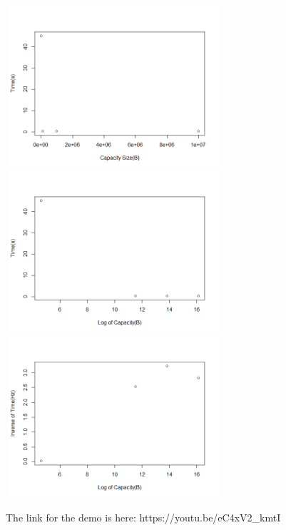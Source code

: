 \documentclass[12pt]{article}
\begin{document}
\begin{center}
\includegraphics[width=8cm, height=6cm]{Time_Plot_Normal}
\includegraphics[width=8cm, height=6cm]{Time_Plot_xlog}
\includegraphics[width=8cm, height=6cm]{Time_Plot_xlog_y}
\end{center}

The link for the demo is here: https://youtu.be/eC4xV2\_kmtI
\end{document}
